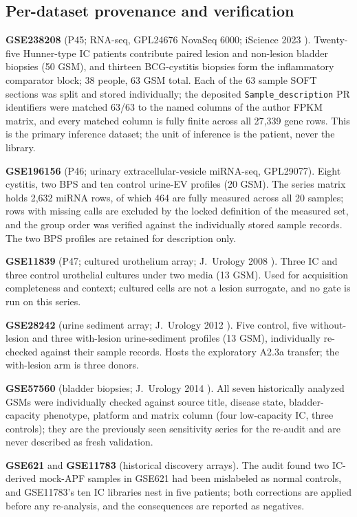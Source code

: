 \documentclass[11pt,a4paper]{article}
\begin{document}
\subsection{Per-dataset provenance and verification}
\textbf{GSE238208} (P45; RNA-seq, GPL24676 NovaSeq 6000; iScience 2023
\cite{akiyama2023}). Twenty-five Hunner-type IC patients contribute paired
lesion and non-lesion bladder biopsies (50 GSM), and thirteen BCG-cystitis
biopsies form the inflammatory comparator block; 38 people, 63 GSM total. Each
of the 63 sample SOFT sections was split and stored individually; the deposited
\texttt{Sample\_description} PR identifiers were matched 63/63 to the named
columns of the author FPKM matrix, and every matched column is fully finite
across all 27{,}339 gene rows. This is the primary inference dataset; the unit
of inference is the patient, never the library.

\textbf{GSE196156} (P46; urinary extracellular-vesicle miRNA-seq, GPL29077).
Eight cystitis, two BPS and ten control urine-EV profiles (20 GSM). The series
matrix holds 2{,}632 miRNA rows, of which 464 are fully measured across all 20
samples; rows with missing calls are excluded by the locked definition of the
measured set, and the group order was verified against the individually stored
sample records. The two BPS profiles are retained for description only.

\textbf{GSE11839} (P47; cultured urothelium array; J.\ Urology 2008
\cite{blalock2008}). Three IC and three control urothelial cultures under two
media (13 GSM). Used for acquisition completeness and context; cultured cells
are not a lesion surrogate, and no gate is run on this series.

\textbf{GSE28242} (urine sediment array; J.\ Urology 2012 \cite{colaco2012}).
Five control, five without-lesion and three with-lesion urine-sediment profiles
(13 GSM), individually re-checked against their sample records. Hosts the
exploratory A2.3a transfer; the with-lesion arm is three donors.

\textbf{GSE57560} (bladder biopsies; J.\ Urology 2014 \cite{walker2014}).
All seven historically analyzed GSMs were individually checked against source
title, disease state, bladder-capacity phenotype, platform and matrix column
(four low-capacity IC, three controls); they are the previously seen
sensitivity series for the re-audit and are never described as fresh
validation.

\textbf{GSE621} \cite{keay2003} and \textbf{GSE11783} \cite{gamo2009}
(historical discovery arrays). The audit found two IC-derived mock-APF samples
in GSE621 had been mislabeled as normal controls, and GSE11783's ten IC
libraries nest in five patients; both corrections are applied before any
re-analysis, and the consequences are reported as negatives.
\end{document}
